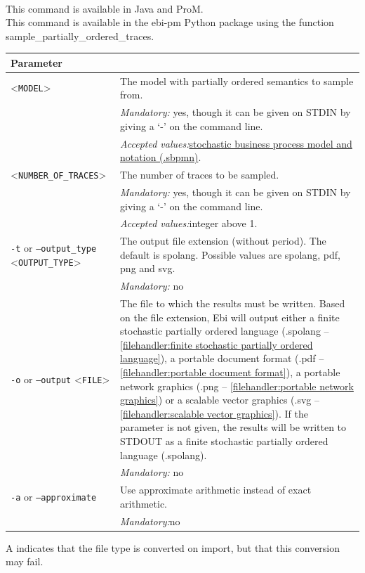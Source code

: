 {\\This command is available in Java and ProM.
\\This command is available in the ebi-pm Python package using the function sample\_partially\_ordered\_traces.
\begin{tabularx}{\linewidth}{lX}
\toprule
Parameter \\\midrule
<\texttt{MODEL}>&The model with partially ordered semantics to sample from.\\
&\textit{Mandatory:} \quad yes, though it can be given on STDIN by giving a `-' on the command line.\\
&\textit{Accepted values:}\quad \hyperref[filehandler:stochastic business process model and notation]{stochastic business process model and notation (.sbpmn)}.\\
<\texttt{NUMBER\_OF\_TRACES}>&The number of traces to be sampled.\\
&\textit{Mandatory:} \quad yes, though it can be given on STDIN by giving a `-' on the command line.\\
&\textit{Accepted values:}\quad integer above 1.\\
\texttt{-t} or \texttt{--output\_type} <\texttt{OUTPUT\_TYPE}> &
The output file extension (without period). The default is spolang. Possible values are spolang, pdf, png and svg.\\
&\textit{Mandatory:} \quad no\\
\texttt{-o} or \texttt{--output} <\texttt{FILE}> &
The file to which the results must be written. Based on the file extension, Ebi will output either a finite stochastic partially ordered language (.spolang -- \cref{filehandler:finite stochastic partially ordered language}), a portable document format (.pdf -- \cref{filehandler:portable document format}), a portable network graphics (.png -- \cref{filehandler:portable network graphics}) or a scalable vector graphics (.svg -- \cref{filehandler:scalable vector graphics}).
If the parameter is not given, the results will be written to STDOUT as a finite stochastic partially ordered language (.spolang).\\
&\textit{Mandatory:} \quad no\\
\texttt{-a} or \texttt{--approximate} & Use approximate arithmetic instead of exact arithmetic.\\
&\textit{Mandatory:}\quad no\\
\bottomrule
\end{tabularx}
A \textdagger{} indicates that the file type is converted on import, but that this conversion may fail.
}
